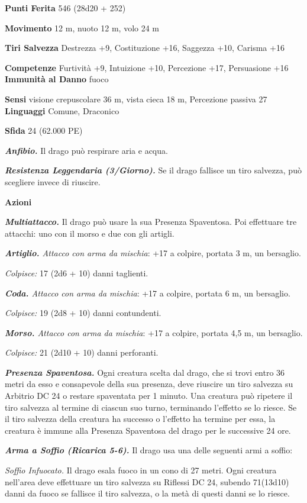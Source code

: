 \begin{multicols}{2}
\textbf{Punti Ferita} 546 (28d20 + 252) 

\textbf{Movimento} 12 m, nuoto 12 m, volo 24 m

\textbf{Tiri Salvezza} Destrezza +9, Costituzione +16, Saggezza +10,
Carisma +16

\textbf{Competenze} Furtività +9, Intuizione +10, Percezione +17,
Persuasione +16 \textbf{Immunità al Danno} fuoco

\textbf{Sensi} visione crepuscolare 36 m, vista cieca 18 m, Percezione passiva
27 \textbf{Linguaggi} Comune, Draconico

\textbf{Sfida} 24 (62.000 PE)\smallskip

\emph{\textbf{Anfibio.}} Il drago può respirare aria e acqua.

\emph{\textbf{Resistenza Leggendaria (3/Giorno).}} Se il drago fallisce
un tiro salvezza, può scegliere invece di riuscire.

\smallskip\textbf{Azioni}

\emph{\textbf{Multiattacco.}} Il drago può usare la sua Presenza
Spaventosa. Poi effettuare tre attacchi: uno con il morso e due con gli
artigli.

\emph{\textbf{Artiglio.} Attacco con arma da mischia}: +17 a colpire,
portata 3 m, un bersaglio.

\emph{Colpisce:} 17 (2d6 + 10) danni taglienti.

\emph{\textbf{Coda.} Attacco con arma da mischia}: +17 a colpire,
portata 6 m, un bersaglio.

\emph{Colpisce:} 19 (2d8 + 10) danni contundenti.

\emph{\textbf{Morso.} Attacco con arma da mischia}: +17 a colpire,
portata 4,5 m, un bersaglio.

\emph{Colpisce:} 21 (2d10 + 10) danni perforanti.

\emph{\textbf{Presenza Spaventosa.}} Ogni creatura scelta dal drago, che
si trovi entro 36 metri da esso e consapevole della sua presenza, deve
riuscire un tiro salvezza su Arbitrio DC 24 o restare spaventata per 1
minuto. Una creatura può ripetere il tiro salvezza al termine di ciascun
suo turno, terminando l'effetto se lo riesce. Se il tiro salvezza della
creatura ha successo o l'effetto ha termine per essa, la creatura è
immune alla Presenza Spaventosa del drago per le successive 24 ore.

\emph{\textbf{Arma a Soffio (Ricarica 5-6).}} Il drago usa una delle
seguenti armi a soffio:

\emph{Soffio Infuocato.} Il drago esala fuoco in un cono di 27 metri.
Ogni creatura nell'area deve effettuare un tiro salvezza su Riflessi DC
24, subendo 71(13d10) danni da fuoco se fallisce il tiro salvezza, o la
metà di questi danni se lo riesce.


\end{multicols}
